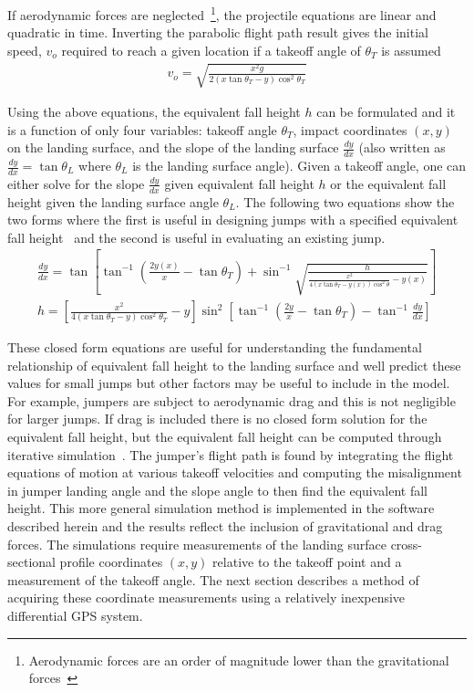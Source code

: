 \documentclass{article}
\begin{document}
If aerodynamic forces are neglected~\footnote{Aerodynamic forces are an order
of magnitude lower than the gravitational forces~\cite{Hubbard2012}}, the
projectile equations are linear and quadratic in time. Inverting the parabolic
flight path result gives the initial speed, $v_o$ required to reach a given
location if a takeoff angle of $\theta_T$ is assumed
%
\begin{align}
  v_o = \sqrt{\frac{x^2g}{2(x \tan\theta_T - y)\cos^{2}\theta_T}}
\end{align}

Using the above equations, the equivalent fall height $h$ can be formulated and
it is a function of only four variables: takeoff angle $\theta_T$, impact
coordinates $(x, y)$ on the landing surface, and the slope of the landing
surface $\frac{dy}{dx}$ (also written as $\frac{dy}{dx}=\tan\theta_L$ where
$\theta_L$ is the landing surface angle). Given a takeoff angle, one can either
solve for the slope $\frac{dy}{dx}$ given equivalent fall height $h$ or the
equivalent fall height given the landing surface angle $\theta_L$. The
following two equations show the two forms where the first is useful in
designing jumps with a specified equivalent fall height~\cite{Levy2015} and the
second is useful in evaluating an existing jump.
%
\begin{align}
  \frac{dy}{dx} = \tan\left[\tan^{-1}\left(\frac{2y(x)}{x} - \tan\theta_T\right) +
    \sin^{-1}\sqrt{\frac{h}{\frac{x^2}{4(x\tan\theta_T -
    y(x))\cos^{2}\theta} - y(x)}}\right] \\
  h = \left[\frac{x^2}{4(x\tan\theta_T - y)\cos^{2}\theta_T} -
    y\right]\sin^{2}\left[\tan^{-1}\left(\frac{2y}{x}- \tan\theta_T\right) - \tan^{-1}\frac{dy}{dx}\right]
  \label{eq:efh}
\end{align}

These closed form equations are useful for understanding the fundamental
relationship of equivalent fall height to the landing surface and well predict
these values for small jumps but other factors may be useful to include in the
model. For example, jumpers are subject to aerodynamic drag and this is not
negligible for larger jumps. If drag is included there is no closed form
solution for the equivalent fall height, but the equivalent fall height can be
computed through iterative simulation~\cite{Levy2015}. The jumper's flight path
is found by integrating the flight equations of motion at various takeoff
velocities and computing the misalignment in jumper landing angle and the slope
angle to then find the equivalent fall height. This more general simulation
method is implemented in the software described herein and the results reflect
the inclusion of gravitational and drag forces. The simulations require
measurements of the landing surface cross-sectional profile coordinates $(x,y)$
relative to the takeoff point and a measurement of the takeoff angle. The next
section describes a method of acquiring these coordinate measurements using a
relatively inexpensive differential GPS system.
\end{document}
